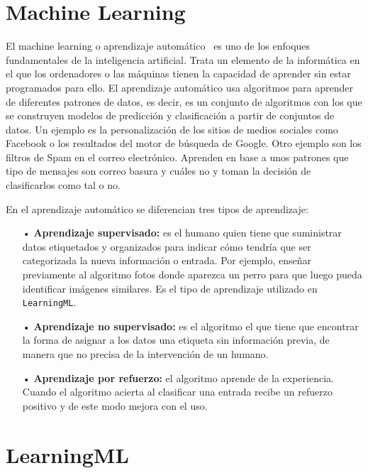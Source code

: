 \documentclass[a4paper, 12pt]{book}
\begin{document}
\section{Machine Learning} 
\label{sec:MachineLearning}
El machine learning o aprendizaje automático~\cite{rouhiainen2018inteligencia}  es uno de los enfoques fundamentales de la inteligencia artificial. 
Trata un elemento de la informática en el que los ordenadores o las máquinas tienen la capacidad de aprender sin estar programados para ello. 
El aprendizaje automático usa algoritmos para aprender de diferentes patrones de datos, es decir, es un conjunto de algoritmos con los que se construyen modelos de predicción y clasificación a partir de conjuntos de datos. 
Un ejemplo es la personalización de los sitios de medios sociales como Facebook o los resultados del motor de
búsqueda de Google. 
Otro ejemplo son  los filtros de Spam en el correo electrónico. 
Aprenden en base a unos patrones que tipo de mensajes son correo basura y cuáles no y toman la decisión de clasificarlos como tal o no.

En el aprendizaje automático se diferencian tres tipos de aprendizaje:

\begin{itemize}

	\item[•] \textbf{Aprendizaje supervisado:} es el humano quien tiene que suministrar datos etiquetados y organizados para indicar cómo tendría que ser categorizada la nueva información o entrada. 
	Por ejemplo, enseñar previamente al algoritmo fotos donde aparezca un perro para que luego pueda identificar imágenes similares. 
	Es el tipo de aprendizaje utilizado en \texttt{LearningML}.
	
	\item[•] \textbf{Aprendizaje no supervisado:} es el algoritmo el que tiene que encontrar la forma de asignar a los datos una etiqueta sin información previa, de manera que no precisa de la intervención de un humano.
	
	\item[•] \textbf{Aprendizaje por refuerzo:} el algoritmo aprende de la experiencia. 
	Cuando el algoritmo acierta al clasificar una entrada recibe un refuerzo positivo y de este modo mejora con el uso.
	
\end{itemize}

\section{LearningML} 
\label{sec:LearningML}
\end{document}
